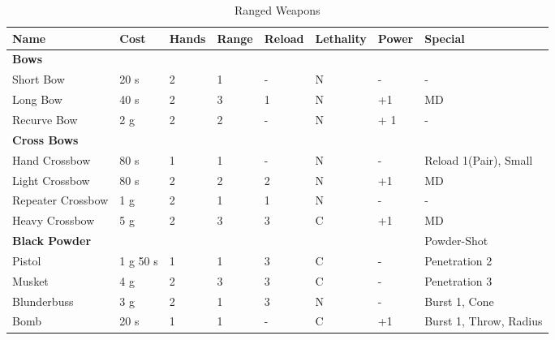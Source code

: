 \begin{table}[ht!]
\caption{Ranged Weapons}
\begin{tabular}{|l|l|l|l|l|l|l|l|}
\hline
Name & Cost & Hands & Range & Reload & Lethality & Power & Special\\ [0.5ex]
\hline
\textbf{Bows} & & & & & & & \\
\hline
Short Bow & 20 s & 2 & 1 & - & N & - & -\\
Long Bow & 40 s & 2 & 3 & 1 & N & +1 & MD \\
Recurve Bow & 2 g & 2 & 2 & - & N & + 1 & -\\
\hline
\textbf{Cross Bows} & & & &  & &  & \\
\hline
Hand Crossbow & 80 s & 1 & 1 & - & N & - & Reload 1(Pair), Small \\ 
Light Crossbow &  80 s & 2 & 2 & 2 & N & +1 & MD\\
Repeater Crossbow & 1 g & 2 & 1 & 1 & N & - & - \\  
Heavy Crossbow & 5 g & 2 & 3 & 3 & C & +1 & MD \\
\hline
\textbf{Black Powder} & & & & & & & Powder-Shot \\
\hline
Pistol & 1 g 50 s & 1 & 1 & 3 & C & - & Penetration 2 \\
Musket & 4 g & 2 & 3 & 3 & C & - & Penetration 3 \\
Blunderbuss & 3 g & 2 & 1 & 3 & N & - & Burst 1, Cone\\
Bomb & 20 s & 1 & 1 & - & C & +1 & Burst 1, Throw, Radius \\
		\hline 
	\end{tabular}
	\label{tab:range-weps}    
\end{table}

